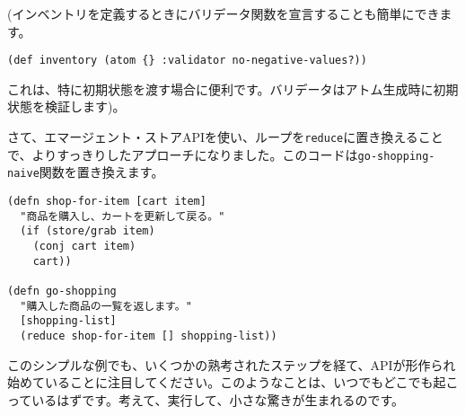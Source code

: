 (インベントリを定義するときにバリデータ関数を宣言することも簡単にできます。


\begin{lstlisting}[numbers=none]
(def inventory (atom {} :validator no-negative-values?))
\end{lstlisting}

これは、特に初期状態を渡す場合に便利です。バリデータはアトム生成時に初期状態を検証します)。

さて、エマージェント・ストアAPIを使い、ループを\texttt{reduce}に置き換えることで、よりすっきりしたアプローチになりました。このコードは\texttt{go-shopping-naive}関数を置き換えます。


\begin{lstlisting}[numbers=none]
(defn shop-for-item [cart item]
  "商品を購入し、カートを更新して戻る。"
  (if (store/grab item)
    (conj cart item)
    cart))

(defn go-shopping
  "購入した商品の一覧を返します。"
  [shopping-list]
  (reduce shop-for-item [] shopping-list))
\end{lstlisting}

このシンプルな例でも、いくつかの熟考されたステップを経て、APIが形作られ始めていることに注目してください。このようなことは、いつでもどこでも起こっているはずです。考えて、実行して、小さな驚きが生まれるのです。





